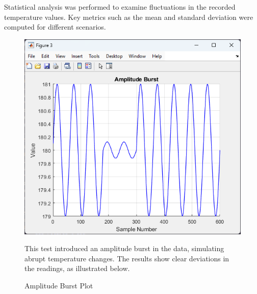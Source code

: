 \documentclass[journal]{IEEEtran}
\begin{document}
Statistical analysis was performed to examine fluctuations in the recorded temperature values. Key metrics such as the mean and standard deviation were computed for different scenarios.

\begin{figure}[H]
    \centering
    \includegraphics[width=\linewidth]{5.1.1.png}
    \caption{Amplitude Burst Plot}
    \begin{minipage}{\linewidth}
      This test introduced an amplitude burst in the data, simulating abrupt temperature changes. The results show clear deviations in the readings, as illustrated below.
    \end{minipage}
    \label{fig:amplitude_burst}
\end{figure}

\vspace{-10mm} %
\end{document}
